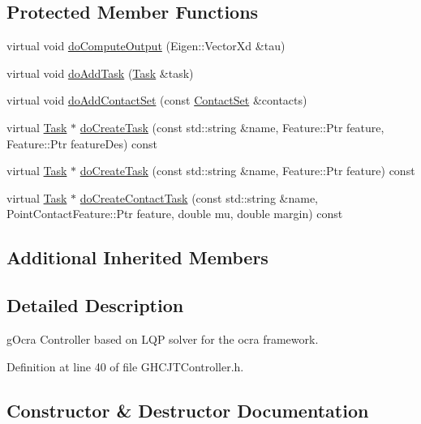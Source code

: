 \subsection*{Protected Member Functions}
\begin{DoxyCompactItemize}
\item 
virtual void \hyperlink{classgocra_1_1GHCJTController_a0f2412763e005e9e18b9129e460411bd}{do\+Compute\+Output} (Eigen\+::\+Vector\+Xd \&tau)
\item 
virtual void \hyperlink{classgocra_1_1GHCJTController_a9d25d23ba6abca6870e9a435ab3d2993}{do\+Add\+Task} (\hyperlink{classocra_1_1Task}{Task} \&task)
\item 
virtual void \hyperlink{classgocra_1_1GHCJTController_a28367b3b895eaa223581131258ef5d2d}{do\+Add\+Contact\+Set} (const \hyperlink{classocra_1_1ContactSet}{Contact\+Set} \&contacts)
\item 
virtual \hyperlink{classocra_1_1Task}{Task} $\ast$ \hyperlink{classgocra_1_1GHCJTController_a989588cb4fa067230026394434c7a901}{do\+Create\+Task} (const std\+::string \&name, Feature\+::\+Ptr feature, Feature\+::\+Ptr feature\+Des) const
\item 
virtual \hyperlink{classocra_1_1Task}{Task} $\ast$ \hyperlink{classgocra_1_1GHCJTController_af7c9e356c0991eff488e110fa4ecea5b}{do\+Create\+Task} (const std\+::string \&name, Feature\+::\+Ptr feature) const
\item 
virtual \hyperlink{classocra_1_1Task}{Task} $\ast$ \hyperlink{classgocra_1_1GHCJTController_a2bee2520ee73a43496cf155eb1c77548}{do\+Create\+Contact\+Task} (const std\+::string \&name, Point\+Contact\+Feature\+::\+Ptr feature, double mu, double margin) const
\end{DoxyCompactItemize}
\subsection*{Additional Inherited Members}


\subsection{Detailed Description}
g\+Ocra Controller based on L\+QP solver for the ocra framework. 



Definition at line 40 of file G\+H\+C\+J\+T\+Controller.\+h.



\subsection{Constructor \& Destructor Documentation}
\hypertarget{classgocra_1_1GHCJTController_a0a9898a818ddf6e52da7d63616bd73f6}{}\label{classgocra_1_1GHCJTController_a0a9898a818ddf6e52da7d63616bd73f6} 
